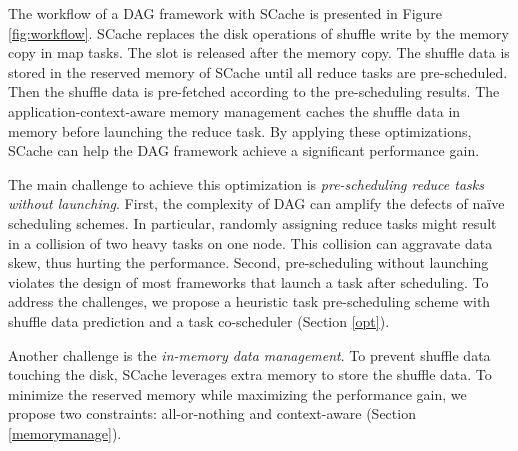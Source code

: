The workflow of a DAG framework with SCache is presented in Figure \ref{fig:workflow}. 
SCache replaces the disk operations of shuffle write by the memory copy in map tasks. 
The slot is released after the memory copy. 
The shuffle data is stored in the reserved memory of SCache until all reduce tasks are pre-scheduled. 
Then the shuffle data is pre-fetched according to the pre-scheduling results.  
The application-context-aware memory management caches the shuffle data in memory before launching the reduce task.
By applying these optimizations, SCache can help the DAG framework achieve a significant performance gain.  

The main challenge to achieve this optimization is \textit{pre-scheduling reduce tasks without launching}. 
First, the complexity of DAG can amplify the defects of na\"{i}ve scheduling schemes. 
In particular, randomly assigning reduce tasks might result in a collision of two heavy tasks on one node. 
This collision can aggravate data skew, thus hurting the performance. 
Second, pre-scheduling without launching violates the design of most frameworks that launch a task after scheduling.
To address the challenges, we propose a heuristic task pre-scheduling scheme with shuffle data prediction and a task co-scheduler (Section \ref{opt}).

Another challenge is the \textit{in-memory data management}. 
To prevent shuffle data touching the disk, SCache leverages extra memory to store the shuffle data. 
To minimize the reserved memory while maximizing the performance gain, we propose two constraints: all-or-nothing and context-aware (Section \ref{memorymanage}).



